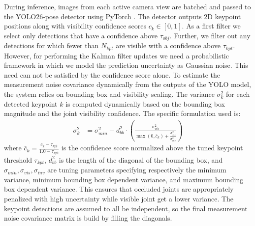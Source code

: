 During inference, images from each active camera view are batched and passed to the YOLO26-pose detector using PyTorch \parencite{paszke2019pytorch,ansel2024pytorch}. The detector outputs 2D keypoint positions along with visibility confidence scores $c_k \in [0, 1]$. As a first filter we select only detections that have a confidence above $\tau_{obj}$. Further, we filter out any detections for which fewer than $N_{kpt}$ are visible with a confidence above $\tau_{kpt}$. However, for performing the Kalman filter updates we need a probabilistic framework in which we model the prediction uncertainty as Gaussian noise. This need can not be satisfied by the confidence score alone. To estimate the measurement noise covariance dynamically from the outputs of the YOLO model, the system relies on bounding box and visibility scaling. The variance $\sigma_k^2$ for each detected keypoint $k$ is computed dynamically based on the bounding box magnitude and the joint visibility confidence. The specific formulation used is:
\begin{align*}
    \sigma_k^2 &= \sigma_{min}^2 + d_{bb}^2 \cdot \left( \frac{\sigma_{vis}^2}{\max(0, \bar{c}_k) + \frac{\sigma_{vis}^2}{\sigma_{inv}^2}} \right)
\end{align*}
where $\bar{c}_k = \frac{c_k - \tau_{kpt}}{1.0 - \tau_{kpt}}$ is the confidence score normalized above the tuned keypoint threshold $\tau_{kpt}$, $d_{bb}^2$ is the length of the diagonal of the bounding box, and $\sigma_{min}, \sigma_{vis}, \sigma_{inv}$ are tuning parameters specifying respectively the minimum variance, minimum bounding box dependent variance, and maximum bounding box dependent variance. This ensures that occluded joints are appropriately penalized with high uncertainty while visible joint get a lower variance. The keypoint detections are assumed to all be independent, so the final measurement noise covariance matrix is build by filling the diagonals.

